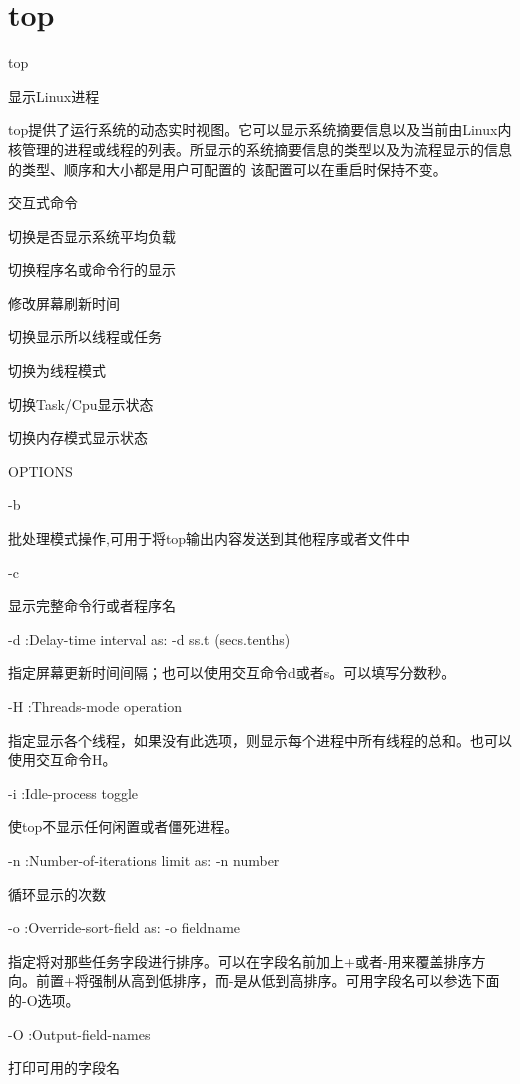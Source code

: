 \section{top}
\label{chap:linux_top}

top

显示Linux进程

top提供了运行系统的动态实时视图。它可以显示系统摘要信息以及当前由Linux内核管理的进程或线程的列表。所显示的系统摘要信息的类型以及为流程显示的信息的类型、顺序和大小都是用户可配置的
该配置可以在重启时保持不变。

交互式命令

     切换是否显示系统平均负载

     切换程序名或命令行的显示

     修改屏幕刷新时间

     切换显示所以线程或任务

     切换为线程模式

     切换Task/Cpu显示状态

     切换内存模式显示状态


OPTIONS

-b  \par
\qquad 批处理模式操作,可用于将top输出内容发送到其他程序或者文件中

-c \par 
\qquad 显示完整命令行或者程序名

-d :Delay-time interval as:  -d ss.t (secs.tenths)  \par 
\qquad  指定屏幕更新时间间隔；也可以使用交互命令d或者s。可以填写分数秒。

-H  :Threads-mode operation \par
\qquad  指定显示各个线程，如果没有此选项，则显示每个进程中所有线程的总和。也可以使用交互命令H。

-i  :Idle-process toggle    \par 
\qquad 使top不显示任何闲置或者僵死进程。

-n  :Number-of-iterations limit as:  -n number  \par 
\qquad  循环显示的次数

-o  :Override-sort-field as:  -o fieldname  \par
\qquad 指定将对那些任务字段进行排序。可以在字段名前加上+或者-用来覆盖排序方向。前置+将强制从高到低排序，而-是从低到高排序。可用字段名可以参选下面的-O选项。

-O  :Output-field-names \par
\qquad 打印可用的字段名


